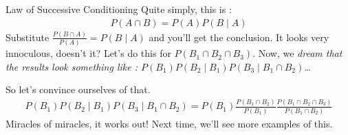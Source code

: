Law of Successive Conditioning
Quite simply, this is : 
\begin{eqnarray*}
P(A \cap B) = P(A)P(B \mid A)
\end{eqnarray*}
Substitute $\frac{P(B \cap A)}{P(A)} = P(B \mid A)$ and you'll get the conclusion.  It looks very innoculous, doesn't it?  Let's do this for $P(B_1 \cap B_2 \cap B_3)$.  Now, we \em dream \em that the results look something like : $P(B_1)P(B_2 \mid B_1)P(B_3 \mid B_1 \cap B_2)$\ldots

So let's convince ourselves of that.
\begin{eqnarray*}
P(B_1)P(B_2 \mid B_1)P(B_3 \mid B_1 \cap B_2) = P(B_1)\frac{P(B_1 \cap B_2)}{P(B_1)}\frac{P(B_1 \cap B_2 \cap B_3)}{P(B_1 \cap B_2)}
\end{eqnarray*}
Miracles of miracles, it works out!  Next time, we'll see more examples of this.


